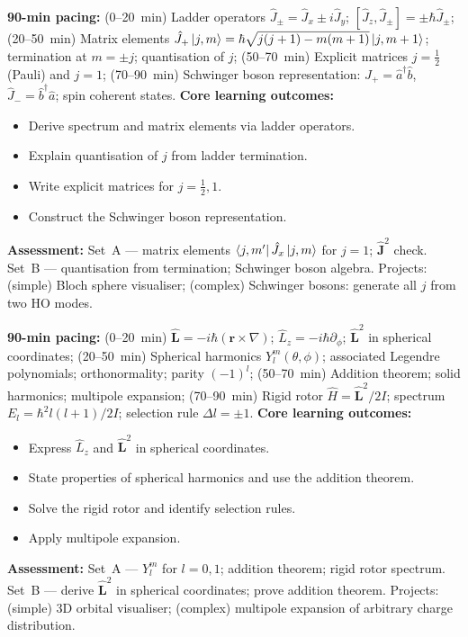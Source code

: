 \documentclass[11pt,a4paper]{article}
\begin{document}
\begin{tcolorbox}[modulebox, title={Module~II.3 / L02: Ladder Operators and Spectrum}]
\textbf{90-min pacing:} (0--20~min) Ladder operators $\hat{J}_\pm=\hat{J}_x\pm i\hat{J}_y$; $[\hat{J}_z,\hat{J}_\pm]=\pm\hbar\hat{J}_\pm$; (20--50~min) Matrix elements $\hat{J}_+\ket{j,m}=\hbar\sqrt{j(j+1)-m(m+1)}\ket{j,m+1}$; termination at $m=\pm j$; quantisation of $j$; (50--70~min) Explicit matrices $j=\tfrac{1}{2}$ (Pauli) and $j=1$; (70--90~min) Schwinger boson representation: $\hat{J}_+=\hat{a}^\dagger\hat{b}$, $\hat{J}_-=\hat{b}^\dagger\hat{a}$; spin coherent states.
\medskip\textbf{Core learning outcomes:}
\begin{itemize}[leftmargin=1.4em,topsep=2pt,itemsep=1pt]
  \item Derive spectrum and matrix elements via ladder operators.
  \item Explain quantisation of $j$ from ladder termination.
  \item Write explicit matrices for $j=\tfrac{1}{2},1$.
  \item Construct the Schwinger boson representation.
\end{itemize}
\medskip\textbf{Assessment:}
Set~A --- matrix elements $\bra{j,m'}\hat{J}_x\ket{j,m}$ for $j=1$; $\hat{\mathbf{J}}^2$ check.
Set~B --- quantisation from termination; Schwinger boson algebra.
Projects: (simple) Bloch sphere visualiser; (complex) Schwinger bosons: generate all $j$ from two HO modes.
\end{tcolorbox}

\medskip

\begin{tcolorbox}[modulebox, title={Module~II.3 / L03: Orbital Angular Momentum and Spherical Harmonics}]
\textbf{90-min pacing:} (0--20~min) $\hat{\mathbf{L}}=-i\hbar(\mathbf{r}\times\nabla)$; $\hat{L}_z=-i\hbar\partial_\phi$; $\hat{\mathbf{L}}^2$ in spherical coordinates; (20--50~min) Spherical harmonics $Y_l^m(\theta,\phi)$; associated Legendre polynomials; orthonormality; parity $(-1)^l$; (50--70~min) Addition theorem; solid harmonics; multipole expansion; (70--90~min) Rigid rotor $\hat{H}=\hat{\mathbf{L}}^2/2I$; spectrum $E_l=\hbar^2l(l+1)/2I$; selection rule $\Delta l=\pm1$.
\medskip\textbf{Core learning outcomes:}
\begin{itemize}[leftmargin=1.4em,topsep=2pt,itemsep=1pt]
  \item Express $\hat{L}_z$ and $\hat{\mathbf{L}}^2$ in spherical coordinates.
  \item State properties of spherical harmonics and use the addition theorem.
  \item Solve the rigid rotor and identify selection rules.
  \item Apply multipole expansion.
\end{itemize}
\medskip\textbf{Assessment:}
Set~A --- $Y_l^m$ for $l=0,1$; addition theorem; rigid rotor spectrum.
Set~B --- derive $\hat{\mathbf{L}}^2$ in spherical coordinates; prove addition theorem.
Projects: (simple) 3D orbital visualiser; (complex) multipole expansion of arbitrary charge distribution.
\end{tcolorbox}
\end{document}
